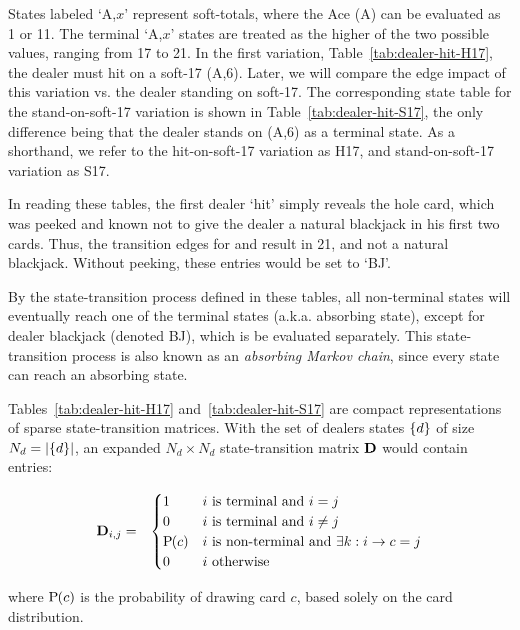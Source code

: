 States labeled `A,$x$' represent soft-totals, where the Ace (A)
can be evaluated as 1 or 11.  
The terminal `A,$x$' states are treated as the higher of the 
two possible values, ranging from 17 to 21.  
In the first variation, Table~\ref{tab:dealer-hit-H17}, 
the dealer must hit on a soft-17 (A,6).
Later, we will compare the edge impact of this variation
vs. the dealer standing on soft-17.
The corresponding state table for the stand-on-soft-17 variation
is shown in Table~\ref{tab:dealer-hit-S17}, 
the only difference being that the dealer stands on (A,6) 
as a terminal state.
As a shorthand, we refer to the hit-on-soft-17 variation as H17, 
and stand-on-soft-17 variation as S17.

In reading these tables, 
the first dealer `hit' simply reveals the hole card, 
which was peeked and known not to give the 
dealer a natural blackjack in his first two cards.
Thus, the transition edges for 
and  result in 21, and not a natural blackjack.
Without peeking, these entries would be set to `BJ'.

By the state-transition process defined in these tables,
all non-terminal states will eventually reach
one of the terminal states (a.k.a. absorbing state), 
except for dealer blackjack (denoted BJ), 
which is be evaluated separately.
This state-transition process is also known as an
\emph{absorbing Markov chain},
since every state can reach an absorbing state.

Tables~\ref{tab:dealer-hit-H17} and~\ref{tab:dealer-hit-S17}
are compact representations of sparse state-transition matrices.
With the set of dealers states $\left\{d\right\}$ of size $N_d=\left|\left\{d\right\}\right|$,
an expanded $N_d \times N_d$ state-transition matrix $\mathbf{D}$ 
would contain entries:

\begin{eqnarray}
\mathbf{D}_{i,j} &=&
\begin{cases}
1 & i~\text{is terminal and } i=j \\
0 & i~\text{is terminal and } i\neq{}j \\
\textrm{P}\hspace{-.5ex}\left(c\right) & i~\text{is non-terminal and } \exists k : i\rightarrow{}c = j \\
0 & i~\text{otherwise}
\end{cases}
\end{eqnarray}

\noindent
where $\textrm{P}\hspace{-.5ex}\left(c\right)$ is the probability of drawing card $c$,
based solely on the card distribution.

